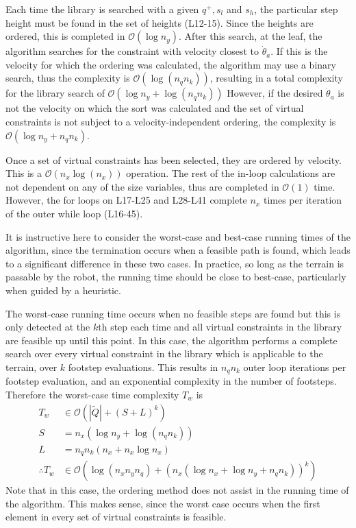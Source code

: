 Each time the library is searched with a given $q^+,s_l$ and $s_h$, the particular step height must be found in the set of heights (L12-15). Since the heights are ordered, this is completed in $\mathcal{O}(\log n_y)$. After this search, at the leaf, the algorithm searches for the constraint with velocity closest to $\dot{\theta}_a$. If this is the velocity for which the ordering was calculated, the algorithm may use a binary search, thus the complexity is $\mathcal{O}(\log(n_qn_k))$, resulting in a total complexity for the library search of $\mathcal{O}(\log n_y+\log(n_qn_k))$ However, if the desired $\dot{\theta}_a$ is not the velocity on which the sort was calculated and the set of virtual constraints is not subject to a velocity-independent ordering, the complexity is $\mathcal{O}(\log n_y +n_qn_k)$.

Once a set of virtual constraints has been selected, they are ordered by velocity. This is a $\mathcal{O}(n_x\log(n_x))$ operation. The rest of the in-loop calculations are not dependent on any of the size variables, thus are completed in $\mathcal{O}(1)$ time. However, the for loops on L17-L25 and L28-L41 complete $n_x$ times per iteration of the outer while loop (L16-45).

It is instructive here to consider the worst-case and best-case running times of the algorithm, since the termination occurs when a feasible path is found, which leads to a significant difference in these two cases. In practice, so long as the terrain is passable by the robot, the running time should be close to best-case, particularly when guided by a heuristic.

The worst-case running time occurs when no feasible steps are found but this is only detected at the $k$th step each time and all virtual constraints in the library are feasible up until this point. In this case, the algorithm performs a complete search over every virtual constraint in the library which is applicable to the terrain, over $k$ footstep evaluations. This results in $n_qn_k$ outer loop iterations per footstep evaluation, and an exponential complexity in the number of footsteps. Therefore the worst-case time complexity $T_w$ is
\begin{align*}
	T_w &\in \mathcal{O}\left(|\tilde{Q}| + (S + L)^k\right) \\
	S &= n_x(\log n_y + \log(n_qn_k)) \\
	L &= n_qn_k(n_x + n_x\log n_x) \\
	\therefore T_w &\in \mathcal{O}\left(\log(n_xn_yn_q)+(n_x(\log n_x + \log n_y + n_qn_k))^k\right)
\end{align*}
Note that in this case, the ordering method does not assist in the running time of the algorithm. This makes sense, since the worst case occurs when the first element in every set of virtual constraints is feasible.

